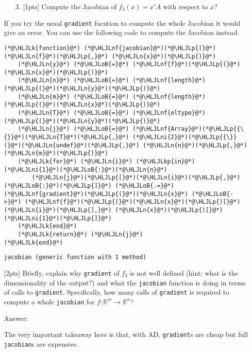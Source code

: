 \documentclass[12pt,a4paper]{article}
\newcommand{\HLJLk}[1]{\textcolor[RGB]{148,91,176}{\textbf{#1}}}
\newcommand{\HLJLkp}[1]{\textcolor[RGB]{148,91,176}{\textbf{#1}}}
\newcommand{\HLJLn}[1]{#1}
\newcommand{\HLJLnf}[1]{\textcolor[RGB]{66,102,213}{#1}}
\newcommand{\HLJLni}[1]{\textcolor[RGB]{59,151,46}{#1}}
\newcommand{\HLJLoB}[1]{\textcolor[RGB]{102,102,102}{\textbf{#1}}}
\newcommand{\HLJLp}[1]{#1}
\begin{document}
\begin{itemize}
\item[3. ] [1pts] Compute the Jacobian of $f_3(x) = x'A$ with respect to $x$?

\end{itemize}
If you try the usual \texttt{gradient} fucntion to compute the whole Jacobian it would give an error. You can use the following code to compute the Jacobian instead.


\begin{lstlisting}
(*@\HLJLk{function}@*) (*@\HLJLnf{jacobian}@*)(*@\HLJLp{(}@*)(*@\HLJLn{f}@*)(*@\HLJLp{,}@*) (*@\HLJLn{x}@*)(*@\HLJLp{)}@*)
    (*@\HLJLn{y}@*) (*@\HLJLoB{=}@*) (*@\HLJLnf{f}@*)(*@\HLJLp{(}@*)(*@\HLJLn{x}@*)(*@\HLJLp{)}@*)
    (*@\HLJLn{n}@*) (*@\HLJLoB{=}@*) (*@\HLJLnf{length}@*)(*@\HLJLp{(}@*)(*@\HLJLn{y}@*)(*@\HLJLp{)}@*)
    (*@\HLJLn{m}@*) (*@\HLJLoB{=}@*) (*@\HLJLnf{length}@*)(*@\HLJLp{(}@*)(*@\HLJLn{x}@*)(*@\HLJLp{)}@*)
    (*@\HLJLn{T}@*) (*@\HLJLoB{=}@*) (*@\HLJLnf{eltype}@*)(*@\HLJLp{(}@*)(*@\HLJLn{y}@*)(*@\HLJLp{)}@*)
    (*@\HLJLn{j}@*) (*@\HLJLoB{=}@*) (*@\HLJLnf{Array}@*)(*@\HLJLp{{\{}}@*)(*@\HLJLn{T}@*)(*@\HLJLp{,}@*) (*@\HLJLni{2}@*)(*@\HLJLp{{\}}(}@*)(*@\HLJLn{undef}@*)(*@\HLJLp{,}@*) (*@\HLJLn{n}@*)(*@\HLJLp{,}@*) (*@\HLJLn{m}@*)(*@\HLJLp{)}@*)
    (*@\HLJLk{for}@*) (*@\HLJLn{i}@*) (*@\HLJLkp{in}@*) (*@\HLJLni{1}@*)(*@\HLJLoB{:}@*)(*@\HLJLn{n}@*)
        (*@\HLJLn{j}@*)(*@\HLJLp{[}@*)(*@\HLJLn{i}@*)(*@\HLJLp{,}@*) (*@\HLJLoB{:}@*)(*@\HLJLp{]}@*) (*@\HLJLoB{.=}@*) (*@\HLJLnf{gradient}@*)(*@\HLJLp{(}@*)(*@\HLJLn{x}@*) (*@\HLJLoB{->}@*) (*@\HLJLnf{f}@*)(*@\HLJLp{(}@*)(*@\HLJLn{x}@*)(*@\HLJLp{)[}@*)(*@\HLJLn{i}@*)(*@\HLJLp{],}@*) (*@\HLJLn{x}@*)(*@\HLJLp{)[}@*)(*@\HLJLni{1}@*)(*@\HLJLp{]}@*)
    (*@\HLJLk{end}@*)
    (*@\HLJLk{return}@*) (*@\HLJLn{j}@*)
(*@\HLJLk{end}@*)
\end{lstlisting}

\begin{lstlisting}
jacobian (generic function with 1 method)
\end{lstlisting}


[2pts] Briefly, explain why \texttt{gradient} of $f_3$ is not well defined (hint: what is the dimensionality of the output?) and what the \texttt{jacobian} function is doing in terms of calls to \texttt{gradient}. Specifically, how many calls of \texttt{gradient} is required to compute a whole \texttt{jacobian} for $f : \mathbb{R}^m \rightarrow \mathbb{R}^n$?

Answer:

The very important takeaway here is that, with AD, \texttt{gradient}s are cheap but full \texttt{jacobian}s are expensive.
\end{document}
